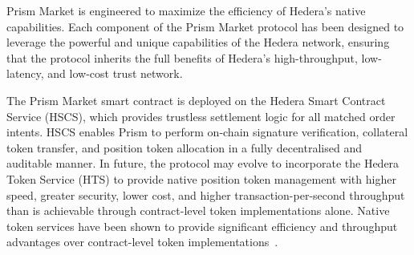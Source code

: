 \documentclass[11pt,a4paper]{article}
\begin{document}


Prism Market is engineered to maximize the efficiency of Hedera's native capabilities. Each component of the Prism Market protocol has been designed to leverage the powerful and unique capabilities of the Hedera network, ensuring that the protocol inherits the full benefits of Hedera's high-throughput, low-latency, and low-cost trust network.

The Prism Market smart contract is deployed on the Hedera Smart Contract Service (HSCS), which provides trustless settlement logic for all matched order intents. HSCS enables Prism to perform on-chain signature verification, collateral token transfer, and position token allocation in a fully decentralised and auditable manner. In future, the protocol may evolve to incorporate the Hedera Token Service (HTS) to provide native position token management with higher speed, greater security, lower cost, and higher transaction-per-second throughput than is achievable through contract-level token implementations alone. Native token services have been shown to provide significant efficiency and throughput advantages over contract-level token implementations~\cite{hedera_hts}.
\end{document}
